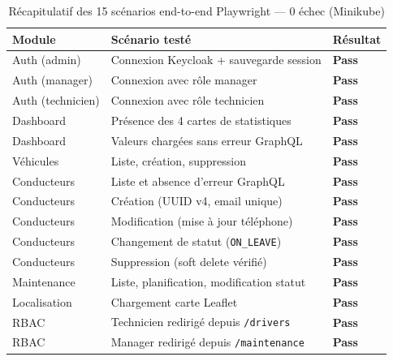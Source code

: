 \documentclass[12pt,a4paper]{article}
\begin{document}
\begin{table}[H]
\centering
\small
\renewcommand{\arraystretch}{1.45}
\begin{tabular}{
  >{\raggedright\arraybackslash}p{3cm}
  >{\raggedright\arraybackslash}p{8.5cm}
  >{\centering\arraybackslash}p{2cm}
}
\toprule
\rowcolor{secondary}
\textbf{Module} & \textbf{Sc\'{e}nario test\'{e}} & \textbf{R\'{e}sultat} \\
\midrule
Auth (admin)      & Connexion Keycloak + sauvegarde session        & \textcolor{success}{\textbf{Pass}} \\
\rowcolor{rowgray}
Auth (manager)    & Connexion avec r\^{o}le manager                & \textcolor{success}{\textbf{Pass}} \\
Auth (technicien) & Connexion avec r\^{o}le technicien             & \textcolor{success}{\textbf{Pass}} \\
\rowcolor{rowgray}
Dashboard         & Pr\'{e}sence des 4 cartes de statistiques      & \textcolor{success}{\textbf{Pass}} \\
Dashboard         & Valeurs charg\'{e}es sans erreur GraphQL        & \textcolor{success}{\textbf{Pass}} \\
\rowcolor{rowgray}
V\'{e}hicules     & Liste, cr\'{e}ation, suppression               & \textcolor{success}{\textbf{Pass}} \\
Conducteurs       & Liste et absence d'erreur GraphQL              & \textcolor{success}{\textbf{Pass}} \\
\rowcolor{rowgray}
Conducteurs       & Cr\'{e}ation (UUID v4, email unique)            & \textcolor{success}{\textbf{Pass}} \\
Conducteurs       & Modification (mise \`{a} jour t\'{e}l\'{e}phone) & \textcolor{success}{\textbf{Pass}} \\
\rowcolor{rowgray}
Conducteurs       & Changement de statut (\texttt{ON\_LEAVE})      & \textcolor{success}{\textbf{Pass}} \\
Conducteurs       & Suppression (soft delete v\'{e}rifi\'{e})       & \textcolor{success}{\textbf{Pass}} \\
\rowcolor{rowgray}
Maintenance       & Liste, planification, modification statut      & \textcolor{success}{\textbf{Pass}} \\
Localisation      & Chargement carte Leaflet                       & \textcolor{success}{\textbf{Pass}} \\
\rowcolor{rowgray}
RBAC              & Technicien redirig\'{e} depuis \texttt{/drivers}  & \textcolor{success}{\textbf{Pass}} \\
RBAC              & Manager redirig\'{e} depuis \texttt{/maintenance} & \textcolor{success}{\textbf{Pass}} \\
\bottomrule
\end{tabular}
\caption{R\'{e}capitulatif des 15 sc\'{e}narios end-to-end Playwright --- 0 \'{e}chec (Minikube)}
\end{table}
\end{document}
